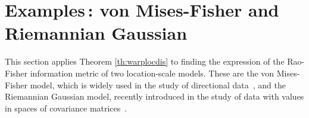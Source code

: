 \documentclass{svmult}
\begin{document}
% 




\section{Examples\,: von Mises-Fisher and Riemannian Gaussian} \label{sec:examples}
This section applies Theorem \ref{th:warplocdis} to finding the expression of the Rao-Fisher information metric of two location-scale models. These are the von Mises-Fisher model, which is widely used in the study of directional data~\cite{jupp}\cite{chikuse}, and the Riemannian Gaussian model, recently introduced in the study of data with values in spaces of covariance matrices~\cite{vemuri,said1,said2}. 
\end{document}
